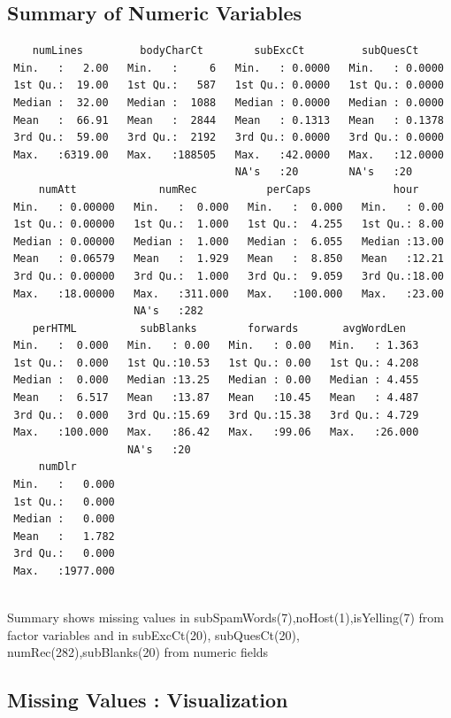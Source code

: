 \documentclass[
]{article}
\begin{document}
\hypertarget{summary-of-numeric-variables}{%
\subsection{Summary of Numeric
Variables}\label{summary-of-numeric-variables}}

\begin{verbatim}
    numLines         bodyCharCt        subExcCt         subQuesCt      
 Min.   :   2.00   Min.   :     6   Min.   : 0.0000   Min.   : 0.0000  
 1st Qu.:  19.00   1st Qu.:   587   1st Qu.: 0.0000   1st Qu.: 0.0000  
 Median :  32.00   Median :  1088   Median : 0.0000   Median : 0.0000  
 Mean   :  66.91   Mean   :  2844   Mean   : 0.1313   Mean   : 0.1378  
 3rd Qu.:  59.00   3rd Qu.:  2192   3rd Qu.: 0.0000   3rd Qu.: 0.0000  
 Max.   :6319.00   Max.   :188505   Max.   :42.0000   Max.   :12.0000  
                                    NA's   :20        NA's   :20       
     numAtt             numRec           perCaps             hour      
 Min.   : 0.00000   Min.   :  0.000   Min.   :  0.000   Min.   : 0.00  
 1st Qu.: 0.00000   1st Qu.:  1.000   1st Qu.:  4.255   1st Qu.: 8.00  
 Median : 0.00000   Median :  1.000   Median :  6.055   Median :13.00  
 Mean   : 0.06579   Mean   :  1.929   Mean   :  8.850   Mean   :12.21  
 3rd Qu.: 0.00000   3rd Qu.:  1.000   3rd Qu.:  9.059   3rd Qu.:18.00  
 Max.   :18.00000   Max.   :311.000   Max.   :100.000   Max.   :23.00  
                    NA's   :282                                        
    perHTML          subBlanks        forwards       avgWordLen    
 Min.   :  0.000   Min.   : 0.00   Min.   : 0.00   Min.   : 1.363  
 1st Qu.:  0.000   1st Qu.:10.53   1st Qu.: 0.00   1st Qu.: 4.208  
 Median :  0.000   Median :13.25   Median : 0.00   Median : 4.455  
 Mean   :  6.517   Mean   :13.87   Mean   :10.45   Mean   : 4.487  
 3rd Qu.:  0.000   3rd Qu.:15.69   3rd Qu.:15.38   3rd Qu.: 4.729  
 Max.   :100.000   Max.   :86.42   Max.   :99.06   Max.   :26.000  
                   NA's   :20                                      
     numDlr        
 Min.   :   0.000  
 1st Qu.:   0.000  
 Median :   0.000  
 Mean   :   1.782  
 3rd Qu.:   0.000  
 Max.   :1977.000  
                   
\end{verbatim}

Summary shows missing values in subSpamWords(7),noHost(1),isYelling(7)
from factor variables and in subExcCt(20), subQuesCt(20),
numRec(282),subBlanks(20) from numeric fields

\hypertarget{missing-values-visualization}{%
\subsection{Missing Values :
Visualization}\label{missing-values-visualization}}
\end{document}
